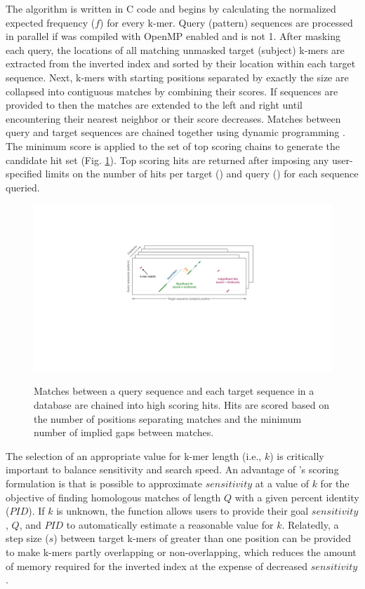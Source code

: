 The  algorithm is written in C code and begins by calculating the normalized expected frequency (\(f\)) for every k-mer. Query (pattern) sequences are processed in parallel if  was compiled with OpenMP enabled and  is not 1. After masking each query, the locations of all matching unmasked target (subject) k-mers are extracted from the inverted index and sorted by their location within each target sequence. Next, k-mers with starting positions separated by exactly the  size are collapsed into contiguous matches by combining their scores. If  sequences are provided to  then the matches are extended to the left and right until encountering their nearest neighbor or their score decreases. Matches between query and target sequences are chained together using dynamic programming \citep{RN4260}. The minimum score is applied to the set of top scoring chains to generate the candidate hit set (Fig. \ref{fig:fig2}). Top scoring hits are returned after imposing any user-specified limits on the number of hits per target () and query () for each sequence queried.

\begin{figure}
\includegraphics[width=1\linewidth,alt={}]{figures/Fig2} \caption{Matches between a query sequence and each target sequence in a database are chained into high scoring hits. Hits are scored based on the number of positions separating matches and the minimum number of implied gaps between matches.}\label{fig:fig2}
\end{figure}

The selection of an appropriate value for k-mer length (i.e., \(k\)) is critically important to balance sensitivity and search speed. An advantage of 's scoring formulation is that is possible to approximate \(sensitivity\) at a value of \(k\) for the objective of finding homologous matches of length \(Q\) with a given percent identity (\(PID\)). If \(k\) is unknown, the  function allows users to provide their goal \(sensitivity\), \(Q\), and \(PID\) to automatically estimate a reasonable value for \(k\). Relatedly, a step size (\(s\)) between target k-mers of greater than one position can be provided to make k-mers partly overlapping or non-overlapping, which reduces the amount of memory required for the inverted index at the expense of decreased \(sensitivity\).

